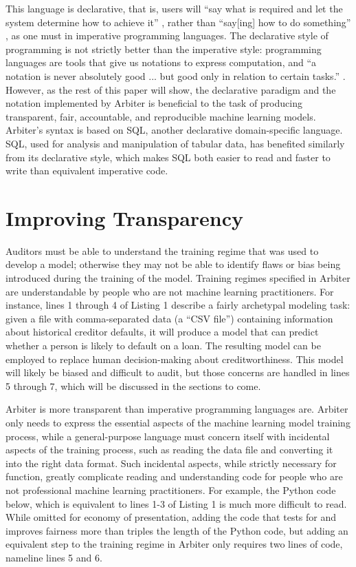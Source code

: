 \documentclass[sigconf]{acmart}
\begin{document}
This language is declarative, that is, users will ``say what is required and let the system determine how to achieve it'' \citep{Roy2004}, rather than ``say[ing] how to do something'' \citep{Roy2004}, as one must in imperative programming languages. The declarative style of programming is not strictly better than the imperative style: programming languages are tools that give us notations to express computation, and ``a notation is never absolutely good ... but good only in relation to certain tasks.'' \citep{Green1989}. However, as the rest of this paper will show, the declarative paradigm and the notation implemented by Arbiter is beneficial to the task of producing transparent, fair, accountable, and reproducible machine learning models. Arbiter's syntax is based on SQL, another declarative domain-specific language. SQL, used for analysis and manipulation of tabular data, has benefited similarly from its declarative style, which makes SQL both easier to read and faster to write than equivalent imperative code.

\section{Improving Transparency}
Auditors must be able to understand the training regime that was used to develop a model; otherwise they may not be able to identify flaws or bias being introduced during the training of the model. Training regimes specified in Arbiter are understandable by people who are not machine learning practitioners. For instance, lines 1 through 4 of Listing 1 describe a fairly archetypal modeling task: given a file with comma-separated data (a ``CSV file'') containing information about historical creditor defaults, it will produce a model that can predict whether a person is likely to default on a loan. The resulting model can be employed to replace human decision-making about creditworthiness. This model will likely be biased and difficult to audit, but those concerns are handled in lines 5 through 7, which will be discussed in the sections to come.

Arbiter is more transparent than imperative programming languages are. Arbiter only needs to express the essential aspects of the machine learning model training process, while a general-purpose language must concern itself with incidental aspects of the training process, such as reading the data file and converting it into the right data format. Such incidental aspects, while strictly necessary for function, greatly complicate reading and understanding code for people who are not professional machine learning practitioners. For example, the Python code below, which is equivalent to lines 1-3 of Listing 1 is much more difficult to read. While omitted for economy of presentation, adding the code that tests for and improves fairness more than triples the length of the Python code, but adding an equivalent step to the training regime in Arbiter only requires two lines of code, nameline lines 5 and 6.
\end{document}
